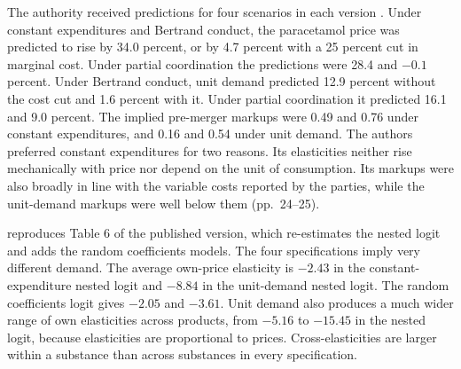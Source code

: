  The authority received predictions for four scenarios in each version
\citep[Table 5]{BjornerstedtVerboven2013}. Under constant expenditures and Bertrand conduct, the paracetamol price was
predicted to rise by 34.0 percent, or by 4.7 percent with a 25 percent cut in marginal cost. Under partial
coordination the predictions were 28.4 and $-0.1$ percent. Under Bertrand conduct, unit demand predicted 12.9 percent
without the cost cut and 1.6 percent with it. Under partial coordination it predicted 16.1 and 9.0 percent. The implied pre-merger markups were 0.49 and 0.76 under
constant expenditures, and 0.16 and 0.54 under unit demand. The authors preferred constant expenditures for two
reasons. Its elasticities neither rise mechanically with price nor depend on the unit of consumption. Its markups were
also broadly in line with the variable costs reported by the parties, while the unit-demand markups were well below
them (pp.~24--25).

  reproduces Table 6 of the published version, which re-estimates
the nested logit and adds the random coefficients models. The four specifications imply very different demand. The
average own-price elasticity is $-2.43$ in the constant-expenditure nested logit and $-8.84$ in the unit-demand
nested logit. The random coefficients logit gives $-2.05$ and $-3.61$. Unit demand also produces a much wider range
of own elasticities across products, from $-5.16$ to $-15.45$ in the nested logit, because elasticities are
proportional to prices. Cross-elasticities are larger within a substance than across substances in every
specification.

